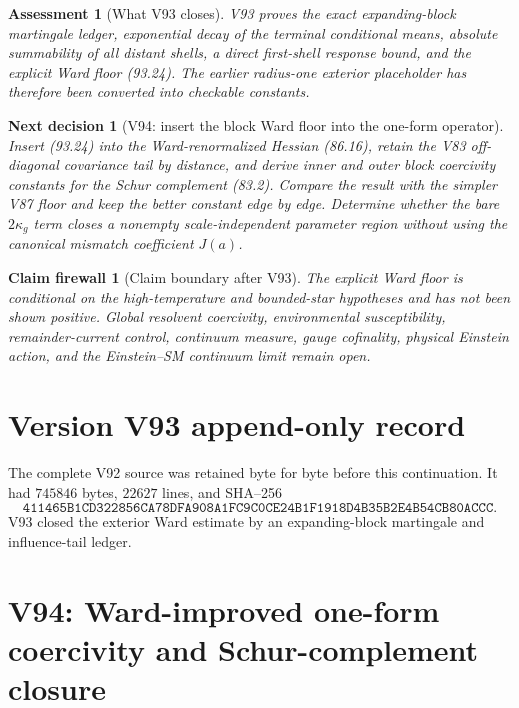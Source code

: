 \documentclass[11pt]{article}
\newtheorem{firewall}[theorem]{Claim firewall}
\newtheorem{decision}[theorem]{Next decision}
\newtheorem{assessment}[theorem]{Assessment}
\theoremstyle{remark}
\begin{document}
\begin{assessment}[What V93 closes]
\label{ass:v17v93-status}
V93 proves the exact expanding-block martingale ledger, exponential
decay of the terminal conditional means, absolute summability of all
distant shells, a direct first-shell response bound, and the explicit
Ward floor (93.24).  The earlier radius-one exterior placeholder has
therefore been converted into checkable constants.
\end{assessment}

\begin{decision}[V94: insert the block Ward floor into the one-form operator]
\label{dec:v17v93-next}
Insert (93.24) into the Ward-renormalized Hessian (86.16), retain the
V83 off-diagonal covariance tail by distance, and derive inner and
outer block coercivity constants for the Schur complement (83.2).
Compare the result with the simpler V87 floor and keep the better
constant edge by edge.  Determine whether the bare
\(2\kappa_g\) term closes a nonempty scale-independent parameter
region without using the canonical mismatch coefficient \(J(a)\).
\end{decision}

\begin{firewall}[Claim boundary after V93]
\label{fire:v17v93}
The explicit Ward floor is conditional on the high-temperature and
bounded-star hypotheses and has not been shown positive.  Global
resolvent coercivity, environmental susceptibility, remainder-current
control, continuum measure, gauge cofinality, physical Einstein
action, and the Einstein--SM continuum limit remain open.
\end{firewall}

\section*{Version V93 append-only record}
The complete V92 source was retained byte for byte before this
continuation.  It had \(745846\) bytes, \(22627\) lines, and SHA--256
\[
 \texttt{411465B1CD322856CA78DFA908A1FC9C0CE24B1F1918D4B35B2E4B54CB80ACCC}.
\]
V93 closed the exterior Ward estimate by an expanding-block
martingale and influence-tail ledger.


\section{V94: Ward-improved one-form coercivity and Schur-complement closure}
\label{sec:v17v94}
\end{document}
